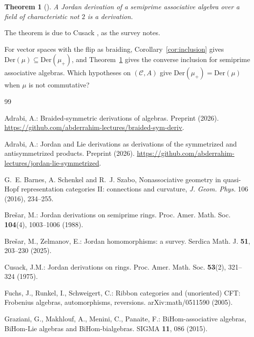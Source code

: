\documentclass[]{interact}
\theoremstyle{plain}
\newtheorem{theorem}{Theorem}[section]
\theoremstyle{definition}
\theoremstyle{remark}
\newcommand{\Der}{\mathrm{Der}}
\begin{document}
\begin{theorem}[{\citep[Theorem 11.1]{BresarZelmanov2025}}]\label{thm:semiprime}
A Jordan derivation of a semiprime associative algebra over a field of characteristic not $2$ is a derivation.
\end{theorem}

The theorem is due to Cusack \citep[Corollary 5]{Cusack1975}, as the survey notes.

For vector spaces with the flip as braiding, Corollary~\ref{cor:inclusion} gives $\Der(\mu) \subseteq \Der(\mu_+)$, and Theorem~\ref{thm:semiprime} gives the converse inclusion for semiprime associative algebras.
Which hypotheses on $(\mathcal{C}, A)$ give $\Der(\mu_+) = \Der(\mu)$ when $\mu$ is not commutative?

\begin{thebibliography}{99}

Adrabi, A.: Braided-symmetric derivations of algebras. Preprint (2026). \url{https://github.com/abderrahim-lectures/braided-sym-deriv}.

Adrabi, A.: Jordan and Lie derivations as derivations of the symmetrized and antisymmetrized products. Preprint (2026). \url{https://github.com/abderrahim-lectures/jordan-lie-symmetrized}.

G.~E. Barnes, A. Schenkel and R.~J. Szabo, Nonassociative geometry in quasi-Hopf representation categories II: connections and curvature, \emph{J. Geom. Phys.} 106 (2016), 234--255.

Bre\v{s}ar, M.: Jordan derivations on semiprime rings. Proc. Amer. Math. Soc. \textbf{104}(4), 1003--1006 (1988).

Bre\v{s}ar, M., Zelmanov, E.: Jordan homomorphisms: a survey. Serdica Math. J. \textbf{51}, 203--230 (2025).

Cusack, J.M.: Jordan derivations on rings. Proc. Amer. Math. Soc. \textbf{53}(2), 321--324 (1975).

Fuchs, J., Runkel, I., Schweigert, C.: Ribbon categories and (unoriented) CFT: Frobenius algebras, automorphisms, reversions. arXiv:math/0511590 (2005).

Graziani, G., Makhlouf, A., Menini, C., Panaite, F.: BiHom-associative algebras, BiHom-Lie algebras and BiHom-bialgebras. SIGMA \textbf{11}, 086 (2015).


\end{thebibliography}
\end{document}
